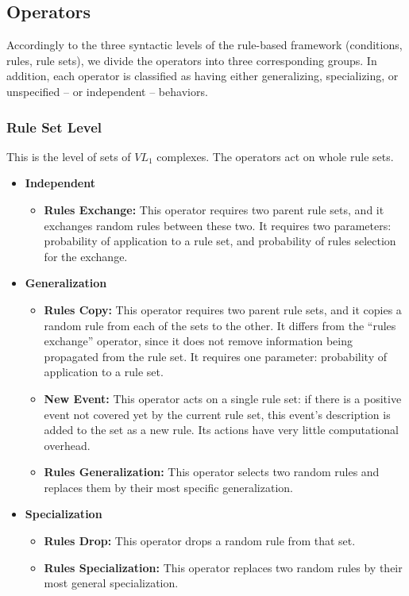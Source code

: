 \documentclass[../main.tex]{subfiles}
\begin{document}
\subsection{Operators}
Accordingly to the three syntactic levels of the rule-based framework (conditions, rules, rule sets), we divide the
operators into three corresponding groups. In addition, each operator is classified as having either generalizing,
specializing, or unspecified -- or independent -- behaviors.

\subsubsection{Rule Set Level} This is the level of sets of $VL_1$ complexes. The operators act on whole rule sets.

\begin{itemize}
	\item \textbf{Independent}
	\begin{itemize}
		\item \textbf{Rules Exchange:} This operator requires two parent rule sets, and it exchanges random rules
		between these two. It requires two parameters: probability of application to a rule set, and probability of
		rules selection for the exchange.
	\end{itemize}
	\item \textbf{Generalization}
	\begin{itemize}
		\item \textbf{Rules Copy:} This operator requires two parent rule sets, and it copies a random rule from each
		of the sets to the other. It differs from the ``rules exchange'' operator, since it does not remove information
		being propagated from the rule set. It requires one parameter: probability of application to a rule set.
		\item \textbf{New Event:} This operator acts on a single rule set: if there is a positive event not covered yet
		by the current rule set, this event's description is added to the set as a new rule. Its actions have very
		little computational overhead.
		\item \textbf{Rules Generalization:} This operator selects two random rules and replaces them by their most
specific generalization.
	\end{itemize}
	\item \textbf{Specialization}
	\begin{itemize}
		\item \textbf{Rules Drop:} This operator drops a random rule from that set.
		\item \textbf{Rules Specialization:} This operator replaces two random rules
		by their most general specialization.
	\end{itemize}
\end{itemize}
\end{document}
